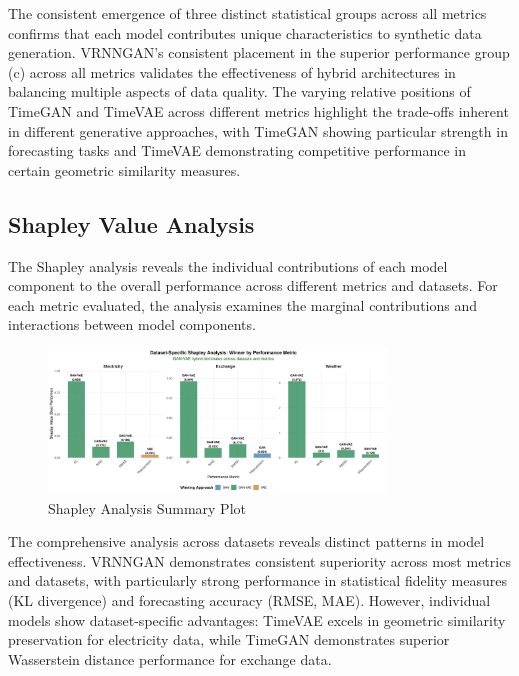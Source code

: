 \documentclass{article}
\begin{document}
The consistent emergence of three distinct statistical groups across all metrics confirms that each model contributes unique characteristics to synthetic data generation. VRNNGAN's consistent placement in the superior performance group (c) across all metrics validates the effectiveness of hybrid architectures in balancing multiple aspects of data quality. The varying relative positions of TimeGAN and TimeVAE across different metrics highlight the trade-offs inherent in different generative approaches, with TimeGAN showing particular strength in forecasting tasks and TimeVAE demonstrating competitive performance in certain geometric similarity measures.

\subsection{Shapley Value Analysis}
The Shapley analysis reveals the individual contributions of each model component to the overall performance across different metrics and datasets. For each metric evaluated, the analysis examines the marginal contributions and interactions between model components.


\begin{figure}[H]
\centering
\includegraphics[width=0.8\textwidth]{assets/shapley_dataset_winners.png}
\caption{Shapley Analysis Summary Plot}
\label{fig:shap}
\end{figure}

The comprehensive analysis across datasets reveals distinct patterns in model effectiveness. VRNNGAN demonstrates consistent superiority across most metrics and datasets, with particularly strong performance in statistical fidelity measures (KL divergence) and forecasting accuracy (RMSE, MAE). However, individual models show dataset-specific advantages: TimeVAE excels in geometric similarity preservation for electricity data, while TimeGAN demonstrates superior Wasserstein distance performance for exchange data. 
\end{document}
